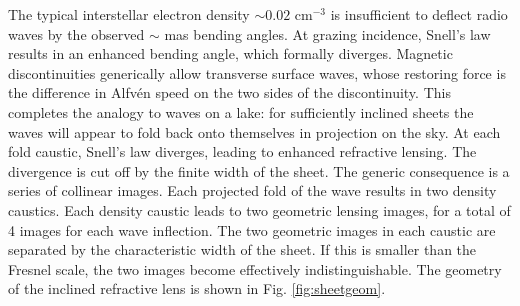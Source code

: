 \documentclass[useAMS,usenatbib]{mn2e}
\begin{document}
The typical interstellar electron density $\sim 0.02$ cm$^{-3}$ 
is insufficient to deflect
radio waves by the observed $\sim$ mas bending angles.  At grazing
incidence, Snell's law results in an enhanced bending angle, which
formally diverges.  Magnetic discontinuities generically allow transverse surface waves, whose restoring force is the difference in Alfv\'en
speed on the two sides of the discontinuity.  This completes the
analogy to waves on a lake: for sufficiently inclined sheets the waves
will appear to fold back onto themselves in projection on the sky.  At
each fold caustic, Snell's law diverges, leading to enhanced
refractive lensing.  The divergence is cut off by the finite width of
the sheet.  The generic consequence is a series of collinear images.
Each projected fold of the wave results in two density caustics.  Each density
caustic leads to two geometric lensing images, for a total of 4 images
for each wave inflection.  The two geometric images in each caustic are
separated by the characteristic width of the sheet. If this is smaller
than the Fresnel scale, the two images become effectively
indistinguishable. 
The geometry of the inclined refractive lens is shown in Fig. \ref{fig:sheetgeom}.
\end{document}
